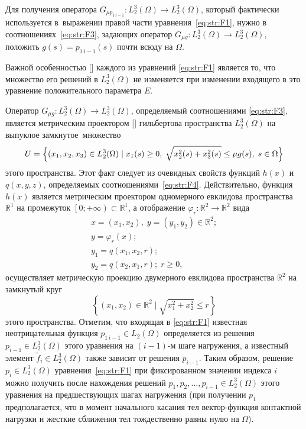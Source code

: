 Для получения оператора $G_{\mu p_{1 \, i-1} } \colon L_{2}^{3} (\Omega)\to L_{2}^{3} (\Omega)$, который фактически используется в~выражении правой части уравнения~\eqref{eq:str:F1}, нужно в соотношениях~\eqref{eq:str:F3}, задающих оператор $G_{\mu g} \colon L_{2}^{3} (\Omega)\to L_{2}^{3} (\Omega)$, положить $g(s)=p_{1 \, i-1} (s)$ почти всюду на $\Omega $.


Важной особенностью [] каждого из уравнений \eqref{eq:str:F1} является то, что множество его решений в $L_{2}^{3} (\Omega)$ не изменяется при изменении входящего в это уравнение положительного параметра $E$.

Оператор $G_{\mu g} \colon L_{2}^{3} (\Omega)\to L_{2}^{3} (\Omega)$, определяемый соотношениями \eqref{eq:str:F3}, является метрическим проектором [] гильбертова пространства $L_{2}^{3} (\Omega)$ на выпуклое замкнутое~множество 
$$
U=\Bigl\{(x_{1} ,x_{2} ,x_{3} )\in L_{2}^{3} (\Omega) \; |\; x_{1} (s)\ge 0, \; \sqrt{x_{2}^{2} (s)+x_{3}^{2} (s)} \le \mu g(s), \; s\in\Omega \Bigr\}$$
 этого пространства.
Этот факт следует из очевидных свойств функций $h(x)$ и~$q\left(x,y,z\right)$, определяемых соотношениями~\eqref{eq:str:F4}.
Действительно, функция $h(x)$ является метрическим проектором одномерного евклидова пространства $\mathbb R^{1} $ на промежуток $\left[0;+\infty \right)\subset \mathbb R^{1} $, а отображение $\varphi _{r} \colon \mathbb R^{2} \to \mathbb R^{2} $ вида
$$
\begin{array}{l} 
x=(x_{1} ,x_{2} ), \; y=(y_{1} ,y_{2} )\in \mathbb R^{2} ; 
\\ 
y=\varphi _{r} (x); 
\\ 
y_{1} =q(x_{1} ,x_{2} ,r); 
\\ 
y_{2} =q(x_{2} ,x_{1} ,r);\; r\ge 0, 
\end{array}
$$
осуществляет метрическую проекцию двумерного евклидова пространства $\mathbb R^{2} $ на замкнутый круг 
$$\left\{(x_{1} ,x_{2} )\in\mathbb  R^{2}  \; |\; \sqrt{x_{1}^{2} +x_{2}^{2} } \le r\right\}$$ 
этого пространства.
Отметим, что входящая в \eqref{eq:str:F1} известная неотрицательная функция $p_{1\,i-1} \in L_{2} (\Omega)$ определяется из решения $p_{i-1} \in L_{2}^{3} (\Omega)$ этого уравнения на $\left(i-1\right)$-м шаге нагружения, а известный элемент $\tilde{f}_{i} \in L_{2}^{3} (\Omega)$ также зависит от решения $p_{i-1} $.
Таким образом, решение $p_{i} \in L_{2}^{3} (\Omega)$ уравнения~\eqref{eq:str:F1} при фиксированном значении индекса $i$ можно получить после нахождения решений $p_{1} ,p_{2} ,\dots ,p_{i-1} \in L_{2}^{3} (\Omega)$ этого уравнения на предшествующих шагах нагружения (при получении $p_{1} $ предполагается, что в момент начального касания тел вектор-функция контактной нагрузки и жесткие сближения тел тождественно равны нулю на $\Omega $).
